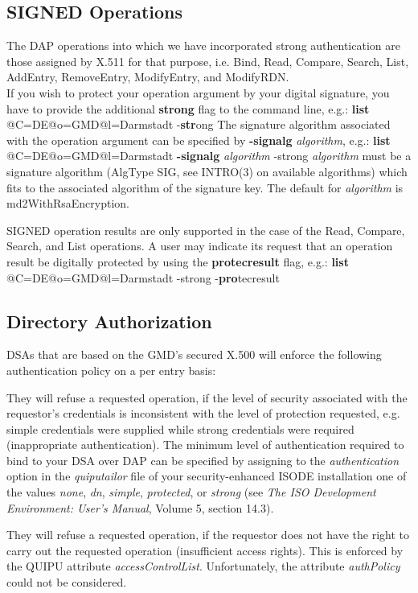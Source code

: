 \subsection{SIGNED Operations}
The DAP operations into which we have incorporated strong authentication are those
assigned by X.511 for that purpose, i.e. Bind, Read, Compare, Search, List, AddEntry, 
RemoveEntry, ModifyEntry, and ModifyRDN.
\\ [1em]
If you wish to protect your operation argument by your digital signature, you have
to provide the additional {\bf strong} flag to the command line, e.g.:
\bvtab
\1 {\bf list} @C=DE@o=GMD@l=Darmstadt -{\bf str}ong 
\evtab
The signature algorithm associated with the operation argument can be specified by 
{\bf -signalg} {\em algorithm}, e.g.: 
\bvtab
\1 {\bf list} @C=DE@o=GMD@l=Darmstadt {\bf -signalg} {\em algorithm} -strong
\evtab
{\em algorithm} must be a signature algorithm (AlgType SIG, see INTRO(3) on available algorithms) 
which fits to the associated algorithm of the signature key. The default for {\em algorithm} is md2WithRsaEncryption.

SIGNED operation results are only supported in the case of the Read, Compare, Search, and List
operations.
A user may indicate its request that an operation result be digitally protected by using
the {\bf protecresult} flag, e.g.:
\bvtab
\1 {\bf list} @C=DE@o=GMD@l=Darmstadt -strong -{\bf pro}tecresult
\evtab


\subsection{Directory Authorization}
DSAs that are based on the GMD's secured X.500 will enforce the following authentication policy 
on a per entry basis:
\bi

\m They will refuse a requested operation, if the level of security associated with the
   requestor's credentials is inconsistent with the level of protection requested, e.g.
   simple credentials were supplied while strong credentials were required
   (inappropriate authentication).
   The minimum level of authentication required to bind to your DSA over DAP can be
   specified by assigning to the {\em authentication} option in the {\em quiputailor} file of your 
   security-enhanced ISODE installation one of the values {\em none}, {\em dn}, {\em simple}, 
   {\em protected}, or {\em strong} (see {\em The ISO Development Environment: User's Manual}, 
   Volume 5, section 14.3).

\m They will refuse a requested operation, if the requestor does not have the right
   to carry out the requested operation (insufficient access rights). This is
   enforced by the QUIPU attribute {\em accessControlList}. Unfortunately, the attribute {\em authPolicy}
   could not be considered.
\ei


